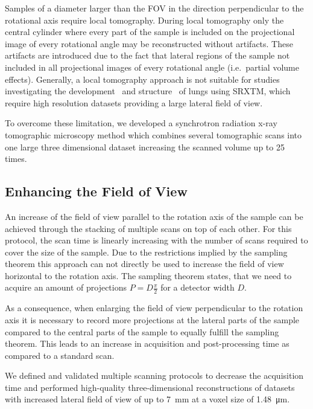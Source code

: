 Samples of a diameter larger than the FOV in the direction perpendicular to the rotational axis require local tomography. During local tomography only the central cylinder where every part of the sample is included on the projectional image of every rotational angle may be reconstructed without artifacts. These artifacts are introduced due to the fact that lateral regions of the sample not included in all projectional images of every rotational angle (i.e.\ partial volume effects). Generally, a local tomography approach is not suitable for studies investigating the development~\cite{Schittny2008,Mund2008} and structure~\cite{Tsuda2008} of lungs using SRXTM, which require high resolution datasets providing a large lateral field of view.

To overcome these limitation, we developed a synchrotron radiation x-ray tomographic microscopy method which combines several tomographic scans into one large three dimensional dataset increasing the scanned volume up to 25 times.

\subsection{Enhancing the Field of View}\label{subsec:enhancing the field of view}%
An increase of the field of view parallel to the rotation axis of the sample can be achieved through the stacking of multiple scans on top of each other. For this protocol, the scan time is linearly increasing with the number of scans required to cover the size of the sample. Due to the restrictions implied by the sampling theorem this approach can not directly be used to increase the field of view horizontal to the rotation axis. The sampling theorem states, that we need to acquire an amount of projections $P=D\frac{\pi}{2}$ for a detector width $D$.

As a consequence, when enlarging the field of view perpendicular to the rotation axis it is necessary to record more projections at the lateral parts of the sample compared to the central parts of the sample to equally fulfill the sampling theorem. This leads to an increase in acquisition and post-processing time as compared to a standard scan.

We defined and validated multiple scanning protocols to decrease the acquisition time and performed high-quality three-dimensional reconstructions of datasets with increased lateral field of view of up to \SI{7}{\milli\meter} at a voxel size of \SI{1.48}{\micro\meter}.